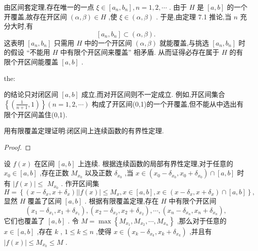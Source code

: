 由区间套定理,存在唯一的一点 \(\xi  \in  \left\lbrack  {{a}_{n},{b}_{n}}\right\rbrack  ,n = 1,2,\cdots\) . 由于 \(H\) 是 \(\left\lbrack  {a,b}\right\rbrack\) 的一个开覆盖,故存在开区间 \(\left( {\alpha ,\beta }\right)  \in  H\) ,使 \(\xi  \in  \left( {\alpha ,\beta }\right)\) . 于是,由定理 7.1 推论,当 \(n\) 充分大时,有
\[
\left\lbrack  {{a}_{n},{b}_{n}}\right\rbrack   \subset  \left( {\alpha ,\beta }\right) .
\]
这表明 \(\left\lbrack  {{a}_{n},{b}_{n}}\right\rbrack\) 只需用 \(H\) 中的一个开区间 \(\left( {\alpha ,\beta }\right)\) 就能覆盖,与挑选 \(\left\lbrack  {{a}_{n},{b}_{n}}\right\rbrack\) 时的假设 “不能用 \(H\) 中有限个开区间来覆盖” 相矛盾. 从而证得必存在属于 \(H\) 的有限个开区间能覆盖 \(\left\lbrack  {a,b}\right\rbrack\) .

\begin{remark}

\end{remark}
\begin{theorem}{}{the:}

\end{theorem}
 的结论只对闭区间 \(\left\lbrack  {a,b}\right\rbrack\) 成立,而对开区间则不一定成立. 例如,开区间集合 \(\left\{  \left( {\frac{1}{n + 1},1}\right) \right\}  \left( {n = 1,2,\cdots }\right)\) 构成了开区间(0,1)的一个开覆盖,但不能从中选出有限个开区间盖住(0,1).

\begin{example}

\end{example}
用有限覆盖定理证明:闭区间上连续函数的有界性定理.

\begin{proof}

\end{proof}
设 \(f\left( x\right)\) 在区间 \(\left\lbrack  {a,b}\right\rbrack\) 上连续. 根据连续函数的局部有界性定理,对于任意的 \({x}_{0} \in  \left\lbrack  {a,b}\right\rbrack\) ,存在正数 \({M}_{{x}_{0}}\) 以及正数 \({\delta }_{{x}_{0}}\) ,当 \(x \in  \left( {{x}_{0} - {\delta }_{{x}_{0}},{x}_{0} + {\delta }_{{x}_{0}}}\right)  \cap  \left\lbrack  {a,b}\right\rbrack\) 时有 \(\left| {f\left( x\right) }\right|  \leq\)  \({M}_{{x}_{0}}\) . 作开区间集
\[
H = \left\{  {\left( {x - {\delta }_{x},x + {\delta }_{x}}\right) \left| \right| f\left( x\right)  \mid   \leq  {M}_{x},x \in  \left\lbrack  {a,b}\right\rbrack  ,x \in  \left( {x - {\delta }_{x},x + {\delta }_{x}}\right)  \cap  \left\lbrack  {a,b}\right\rbrack  }\right\}  ,
\]
显然 \(H\) 覆盖了区间 \(\left\lbrack  {a,b}\right\rbrack\) . 根据有限覆盖定理,存在 \(H\) 中有限个开区间
\[
\left( {{x}_{1} - {\delta }_{{x}_{1}},{x}_{1} + {\delta }_{{x}_{1}}}\right) ,\left( {{x}_{2} - {\delta }_{{x}_{2}},{x}_{2} + {\delta }_{{x}_{2}}}\right) ,\cdots ,\left( {{x}_{n} - {\delta }_{{x}_{n}},{x}_{n} + {\delta }_{{x}_{n}}}\right) ,
\]
它们也覆盖了 \(\left\lbrack  {a,b}\right\rbrack\) . 令 \(M = \max \left\{  {{M}_{{x}_{1}},{M}_{{x}_{2}},\cdots ,{M}_{{x}_{n}}}\right\}\) ,那么对于任意的 \(x \in  \left\lbrack  {a,b}\right\rbrack\) ,存在 \(k\) , \(1 \leq  k \leq  n\) ,使得 \(x \in  \left( {{x}_{k} - {\delta }_{{x}_{k}},{x}_{k} + {\delta }_{{x}_{k}}}\right)\) ,并且有 \(\left| {f\left( x\right) }\right|  \leq  {M}_{{x}_{k}} \leq  M\) .

